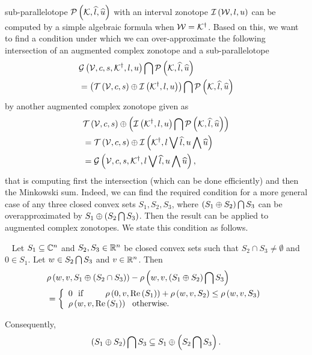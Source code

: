 sub-parallelotope $\mathcal{P}\left(\mathcal{K},\widehat{l},\widehat{u}\right)$ with an interval
zonotope $\mathit{\operatorname{\mathcal{I}}}\left(\mathcal{W},l,u\right)$ can be computed by a simple
algebraic formula when
$\mathcal{W}={\mathcal{K}}^\dagger$.  Based on this, we want to find a condition
under which we can over-approximate the following intersection of an
augmented complex zonotope and a sub-parallelotope
%
\begin{align*}
& \mathcal{G}\left(\mathcal{V},c,s,{\mathcal{K}}^\dagger,l,u\right)\bigcap \mathcal{P}\left(\mathcal{K},\widehat{l},\widehat{u}\right)\\
& =\left(\mathit{\operatorname{\mathcal{T}}}\left(\mathcal{V},c,s\right)\oplus \mathit{\operatorname{\mathcal{I}}}\left({\mathcal{K}}^\dagger,l,u\right)\right)\bigcap \mathcal{P}\left(\mathcal{K},\widehat{l},\widehat{u}\right)
\end{align*}
%
by another augmented complex zonotope given as
%
\begin{align*}
& \mathit{\operatorname{\mathcal{T}}}\left(\mathcal{V},c,s\right)\oplus \left(\mathit{\operatorname{\mathcal{I}}}\left({\mathcal{K}}^\dagger,l,u\right)\bigcap \mathcal{P}\left(\mathcal{K},\widehat{l},\widehat{u}\right)\right)\\
& =
  \mathit{\operatorname{\mathcal{T}}}\left(\mathcal{V},c,s\right)\oplus \mathit{\operatorname{\mathcal{I}}}\left({\mathcal{K}}^\dagger,l\bigvee \widehat{l},u\bigwedge \widehat{u}\right)\\
& = \mathcal{G}\left(\mathcal{V},c,s,{\mathcal{K}}^\dagger,l\bigvee \widehat{l},u\bigwedge \widehat{u}\right),
\end{align*}
%
that is computing first the intersection (which can be done
efficiently) and then the Minkowski sum.  Indeed, we can find the
required condition for a more general case of any three closed convex
sets $S_1,S_2,S_3$, where $\left(S_1\oplus S_2\right)\bigcap S_3$ can be
overapproximated by $S_1\oplus\left(S_2\bigcap S_3\right)$. Then the result
can be applied to augmented complex zonotopes. We state this condition
as follows.
%
\begin{lemma}~\label{gen-int}
Let $S_1\subseteq \mathbb{C}^n$ and $S_2,S_3\in\mathbb{R}^n$ be closed
convex sets such that $S_2\cap S_3\neq \emptyset$ and $0\in S_1$.  Let
$w\in S_2\bigcap S_3$ and $v\in\mathbb{R}^n$.  Then
%
\begin{align}
& \rho\left(w,v,S_1\oplus\left(S_2\cap
  S_3\right)\right)-\rho\left(w,v,\left(S_1\oplus S_2\right)\bigcap S_3\right) \nonumber\\
  & = \left\{
  \begin{array}{l}
   0~~\text{if}~~~~~~~~\rho\left(0,v,\operatorname{Re}\left(S_1\right)\right)+\rho\left(w,v,S_2\right)\leq
   \rho\left(w,v,S_3\right)\\
   \rho\left(w,v,\operatorname{Re}\left(S_1\right)\right)~~\text{otherwise}.
  \end{array}
  \right.
\end{align}
%

Consequently,
%
\[
\left(S_1\oplus S_2\right)\bigcap S_3\subseteq S_1\oplus\left(S_2\bigcap S_3\right).
\]
%
\end{lemma}
